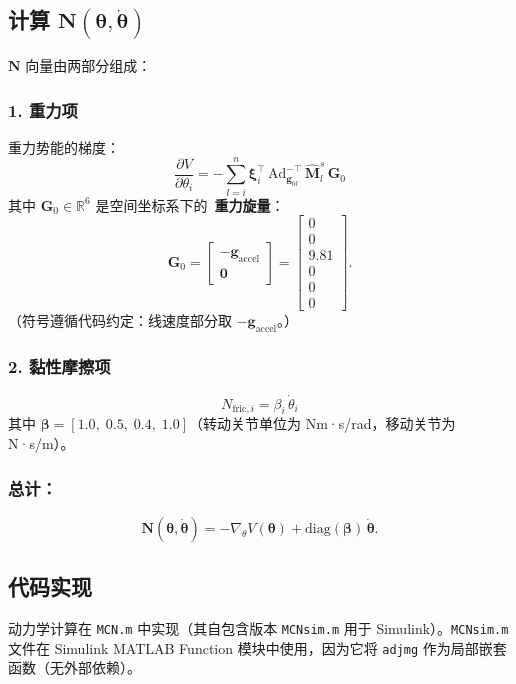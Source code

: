 \documentclass[12pt,a4paper]{ctexart}
\begin{document}
\subsection{\texorpdfstring{计算 $\mathbf{N}(\bm{\theta},\dot{\bm{\theta}})$}{计算 N(theta, dtheta)}}

$\mathbf{N}$ 向量由两部分组成：

\subsubsection*{1. 重力项}
重力势能的梯度：
\[
\frac{\partial V}{\partial\theta_i} = -\sum_{l=i}^{n} \bm{\xi}_i^\top\,
\mathrm{Ad}_{\mathbf{g}_{0l}}^{-\top}\,\hat{\mathbf{M}}_l^s\,
\mathbf{G}_0
\]
其中 $\mathbf{G}_0 \in \mathbb{R}^6$ 是空间坐标系下的\ \textbf{重力旋量}：
\[
\mathbf{G}_0 = \begin{bmatrix} -\mathbf{g}_{\text{accel}} \\ \mathbf{0} \end{bmatrix}
= \begin{bmatrix} 0\\0\\9.81\\0\\0\\0 \end{bmatrix}.
\]
（符号遵循代码约定：线速度部分取 $-\mathbf{g}_{\text{accel}}$。）

\subsubsection*{2. 黏性摩擦项}
\[
N_{\text{fric},i} = \beta_i\,\dot{\theta}_i
\]
其中 $\bm{\beta} = [1.0,\;0.5,\;0.4,\;1.0]$（转动关节单位为 Nm·s/rad，移动关节为 N·s/m）。

\subsubsection*{总计：}
\[
\mathbf{N}(\bm{\theta},\dot{\bm{\theta}}) = -\nabla_\theta V(\bm{\theta}) + \mathrm{diag}(\bm{\beta})\,\dot{\bm{\theta}}.
\]

\subsection{代码实现}

动力学计算在 \texttt{MCN.m} 中实现（其自包含版本 \texttt{MCNsim.m} 用于 Simulink）。\texttt{MCNsim.m} 文件在 Simulink MATLAB Function 模块中使用，因为它将 \texttt{adjmg} 作为局部嵌套函数（无外部依赖）。
\end{document}

